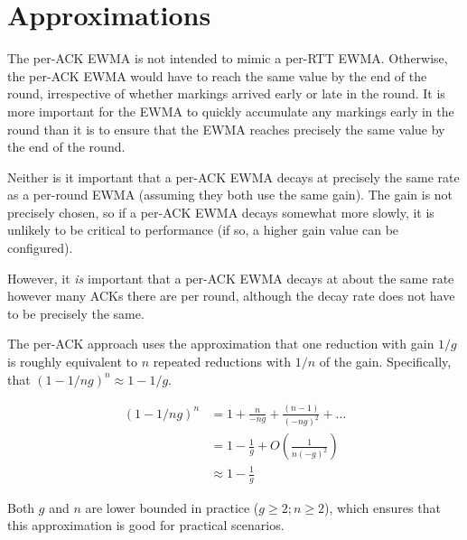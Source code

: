\section{Approximations}\label{prresp_approx}

\balance
The per-ACK EWMA is not intended to mimic a per-RTT EWMA. Otherwise, the per-ACK
EWMA would have to reach the same value by the end of the round, irrespective of
whether markings arrived early or late in the round.
It is more important for the EWMA to quickly accumulate any markings early in
the round than it is to ensure that the EWMA reaches precisely the same value by
the end of the round. 

Neither is it important that a per-ACK EWMA decays at precisely the same rate as
a per-round EWMA (assuming they both use the same gain). The gain is not
precisely chosen, so if a per-ACK EWMA decays somewhat more slowly, it is
unlikely to be critical to performance (if so, a higher gain value can be
configured).

However, it \emph{is} important that a per-ACK EWMA decays at about the same
rate however many ACKs there are per round, although the decay rate does not
have to be precisely the same.

The per-ACK approach uses the approximation that one reduction with gain \(1/g\)
is roughly equivalent to \(n\) repeated reductions with \(1/n\) of the gain.
Specifically, that \((1 - 1/ng)^n \approx 1 - 1/g\).

\begin{align*}
(1 - 1/ng)^n &=       1 + \frac{n}{-ng} + \frac{(n-1)}{(-ng)^2} + \ldots \\
             &=       1 - \frac{1}{g} + O\left(\frac{1}{n(-g)^2}\right)\\
             &\approx 1 - \frac{1}{g}
\end{align*}

Both \(g\) and \(n\) are lower bounded in practice (\(g\ge2; n\ge2\)), which
ensures that this approximation is good for practical scenarios.
